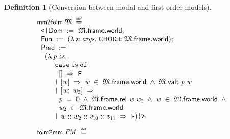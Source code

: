 \documentclass[letterpaper]{article}
\newtheorem{defn}{Definition}
\renewcommand{\HOLConst}[1]{{\textsf{\upshape\small #1}}}
\renewcommand{\HOLKeyword}[1]{\texttt{#1}}
\newenvironment{holmath}{\begin{displaymath}\begin{array}{l}}{\end{array}\end{displaymath}\ignorespacesafterend}
\begin{document}
\begin{defn}[Conversion between modal and first order models]
\begin{holmath}
  \HOLConst{mm2folm}\;\HOLFreeVar{\ensuremath{\mathfrak{M}}}\;\HOLSymConst{\HOLTokenDefEquality{}}\\
\;\;\HOLTokenLeftrec{}\HOLFieldName{Dom}\;:=\;\HOLFreeVar{\ensuremath{\mathfrak{M}}}.\HOLFieldName{frame}.\HOLFieldName{world};\\
\;\;\HOLFieldName{Fun}\;:=\;(\HOLTokenLambda{}\HOLBoundVar{n}\;\HOLBoundVar{args}.\;\HOLConst{CHOICE}\;\HOLFreeVar{\ensuremath{\mathfrak{M}}}.\HOLFieldName{frame}.\HOLFieldName{world});\\
\;\;\HOLFieldName{Pred}\;:=\\
\;\;\;\;(\HOLTokenLambda{}\HOLBoundVar{p}\;\HOLBoundVar{zs}.\\
\;\;\;\;\;\;\;\;\;\HOLKeyword{case}\;\HOLBoundVar{zs}\;\HOLKeyword{of}\\
\;\;\;\;\;\;\;\;\;\;\;[]\;\HOLTokenImp{}\;\HOLConst{F}\\
\;\;\;\;\;\;\;\;\;\HOLTokenBar{}\;[\HOLBoundVar{w}]\;\HOLTokenImp{}\;\HOLBoundVar{w}\;\HOLSymConst{\HOLTokenIn{}}\;\HOLFreeVar{\ensuremath{\mathfrak{M}}}.\HOLFieldName{frame}.\HOLFieldName{world}\;\HOLSymConst{\HOLTokenConj{}}\;\HOLFreeVar{\ensuremath{\mathfrak{M}}}.\HOLFieldName{valt}\;\HOLBoundVar{p}\;\HOLBoundVar{w}\\
\;\;\;\;\;\;\;\;\;\HOLTokenBar{}\;[\HOLBoundVar{w};\;\HOLBoundVar{w\sb{\mathrm{2}}}]\;\HOLTokenImp{}\\
\;\;\;\;\;\;\;\;\;\;\;\HOLBoundVar{p}\;\HOLSymConst{=}\;\HOLNumLit{0}\;\HOLSymConst{\HOLTokenConj{}}\;\HOLFreeVar{\ensuremath{\mathfrak{M}}}.\HOLFieldName{frame}.\HOLFieldName{rel}\;\HOLBoundVar{w}\;\HOLBoundVar{w\sb{\mathrm{2}}}\;\HOLSymConst{\HOLTokenConj{}}\;\HOLBoundVar{w}\;\HOLSymConst{\HOLTokenIn{}}\;\HOLFreeVar{\ensuremath{\mathfrak{M}}}.\HOLFieldName{frame}.\HOLFieldName{world}\;\HOLSymConst{\HOLTokenConj{}}\\
\;\;\;\;\;\;\;\;\;\;\;\HOLBoundVar{w\sb{\mathrm{2}}}\;\HOLSymConst{\HOLTokenIn{}}\;\HOLFreeVar{\ensuremath{\mathfrak{M}}}.\HOLFieldName{frame}.\HOLFieldName{world}\\
\;\;\;\;\;\;\;\;\;\HOLTokenBar{}\;\HOLBoundVar{w}\HOLSymConst{::}\HOLBoundVar{w\sb{\mathrm{2}}}\HOLSymConst{::}\HOLBoundVar{v\sb{\mathrm{10}}}\HOLSymConst{::}\HOLBoundVar{v\sb{\mathrm{11}}}\;\HOLTokenImp{}\;\HOLConst{F})\HOLTokenRightrec{}\\[3mm]
  \HOLConst{folm2mm}\;\HOLFreeVar{FM}\;\HOLSymConst{\HOLTokenDefEquality{}}\\

\end{holmath}
\end{defn}
\end{document}
